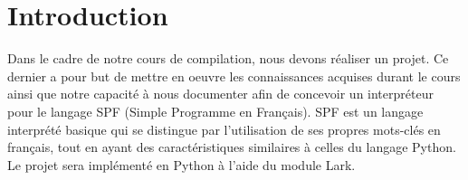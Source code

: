 \section{Introduction}
Dans le cadre de notre cours de compilation, nous devons réaliser un projet.
Ce dernier a pour but de mettre en oeuvre les connaissances acquises durant le cours ainsi que notre capacité à nous documenter afin de concevoir un interpréteur pour le langage SPF (Simple Programme en Français). 
SPF est un langage interprété basique qui se distingue par l'utilisation de ses propres mots-clés en français, tout en ayant des caractéristiques similaires à celles du langage Python.
Le projet sera implémenté en Python à l'aide du module Lark.
